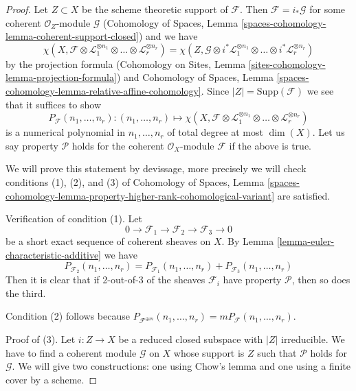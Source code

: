 \begin{proof}
Let $Z \subset X$ be the scheme theoretic support of $\mathcal{F}$.
Then $\mathcal{F} = i_*\mathcal{G}$ for some coherent
$\mathcal{O}_Z$-module $\mathcal{G}$
(Cohomology of Spaces, Lemma
\ref{spaces-cohomology-lemma-coherent-support-closed})
and we have
$$
\chi(X, \mathcal{F} \otimes
\mathcal{L}_1^{\otimes n_1} \otimes \ldots \otimes
\mathcal{L}_r^{\otimes n_r}) =
\chi(Z, \mathcal{G} \otimes
i^*\mathcal{L}_1^{\otimes n_1} \otimes \ldots \otimes
i^*\mathcal{L}_r^{\otimes n_r})
$$
by the projection formula
(Cohomology on Sites, Lemma \ref{sites-cohomology-lemma-projection-formula})
and Cohomology of Spaces, Lemma
\ref{spaces-cohomology-lemma-relative-affine-cohomology}.
Since $|Z| = \text{Supp}(\mathcal{F})$ we see that it suffices
to show
$$
P_\mathcal{F}(n_1, \ldots, n_r) :
(n_1, \ldots, n_r)
\longmapsto
\chi(X, \mathcal{F} \otimes
\mathcal{L}_1^{\otimes n_1} \otimes \ldots \otimes
\mathcal{L}_r^{\otimes n_r})
$$
is a numerical polynomial in $n_1, \ldots, n_r$ of total degree at
most $\dim(X)$. Let us say property $\mathcal{P}$ holds for the
coherent $\mathcal{O}_X$-module $\mathcal{F}$ if the above is true.

\medskip\noindent
We will prove this statement by devissage, more precisely we will
check conditions (1), (2), and (3) of
Cohomology of Spaces, Lemma
\ref{spaces-cohomology-lemma-property-higher-rank-cohomological-variant}
are satisfied.

\medskip\noindent
Verification of condition (1). Let
$$
0 \to \mathcal{F}_1 \to \mathcal{F}_2 \to \mathcal{F}_3 \to 0
$$
be a short exact sequence of coherent sheaves on $X$.
By Lemma \ref{lemma-euler-characteristic-additive} we have
$$
P_{\mathcal{F}_2}(n_1, \ldots, n_r) =
P_{\mathcal{F}_1}(n_1, \ldots, n_r) +
P_{\mathcal{F}_3}(n_1, \ldots, n_r)
$$
Then it is clear that if 2-out-of-3 of the sheaves $\mathcal{F}_i$
have property $\mathcal{P}$, then so does the third.

\medskip\noindent
Condition (2) follows because
$P_{\mathcal{F}^{\oplus m}}(n_1, \ldots, n_r) =
mP_\mathcal{F}(n_1, \ldots, n_r)$.

\medskip\noindent
Proof of (3). Let $i : Z \to X$ be a reduced closed subspace with
$|Z|$ irreducible. We have to find a coherent module $\mathcal{G}$
on $X$ whose support is $Z$ such that $\mathcal{P}$ holds for $\mathcal{G}$.
We will give two constructions: one using Chow's lemma and one
using a finite cover by a scheme.


\end{proof}
